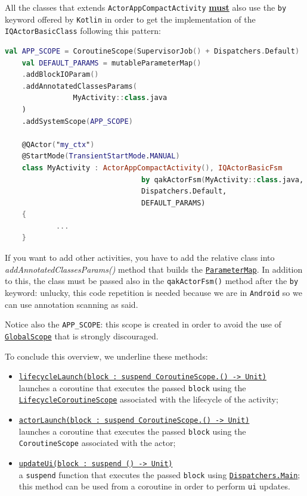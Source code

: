 All the classes that extends \texttt{ActorAppCompactActivity} \underline{\textbf{must}} also use the \texttt{by} keyword offered by \texttt{Kotlin} in order to get the implementation of the \texttt{IQActorBasicClass} following this pattern:
 
\begin{lstlisting}[language=Kotlin]
	val APP_SCOPE = CoroutineScope(SupervisorJob() + Dispatchers.Default)
	val DEFAULT_PARAMS = mutableParameterMap()
	.addBlockIOParam()
	.addAnnotatedClassesParams(
				MyActivity::class.java
	)
	.addSystemScope(APP_SCOPE)

	@QActor("my_ctx")
	@StartMode(TransientStartMode.MANUAL)
	class MyActivity : ActorAppCompactActivity(), IQActorBasicFsm
								by qakActorFsm(MyActivity::class.java,
								Dispatchers.Default,
								DEFAULT_PARAMS)
	{
			...
	}
\end{lstlisting}

If you want to add other activities, you have to add the relative class into \textit{addAnnotatedClassesParams()} method that builds the \href{https://github.com/LM-96/QA-Extensions/blob/main/it.unibo.qakactor/src/main/kotlin/utils/ParameterUtils.kt}{\texttt{ParameterMap}}. In addition to this, the class must be passed also in the \texttt{qakActorFsm()} method after the \texttt{by} keyword: unlucky, this code repetition is needed because we are in \texttt{Android} so we can use annotation scanning as said.

Notice also the \texttt{APP\_SCOPE}:  this scope is created in order to avoid the use of \href{https://kotlinlang.org/api/kotlinx.coroutines/kotlinx-coroutines-core/kotlinx.coroutines/-global-scope/}{\texttt{GlobalScope}} that is strongly discouraged.

To conclude this overview, we underline these methods:
\begin{itemize}
	\item \underline{\texttt{lifecycleLaunch(block : suspend CoroutineScope.() -> Unit)}}\\
	launches a coroutine that executes the passed \texttt{block} using the \href{https://developer.android.com/reference/kotlin/androidx/lifecycle/LifecycleCoroutineScope}{\texttt{LifecycleCoroutineScope}} associated with the lifecycle of the activity;
	
	\item \underline{\texttt{actorLaunch(block : suspend CoroutineScope.() -> Unit)}}\\
	launches a coroutine that executes the passed \texttt{block} using the \texttt{CoroutineScope} associated with the actor;
	
	\item \underline{\texttt{updateUi(block : suspend () -> Unit)}}\\
	a \texttt{suspend} function that executes the passed \texttt{block} using \href{https://developer.android.com/kotlin/coroutines/coroutines-adv#main-safety}{\texttt{Dispatchers.Main}}; this method can be used from a coroutine in order to perform \texttt{ui} updates.
\end{itemize}

